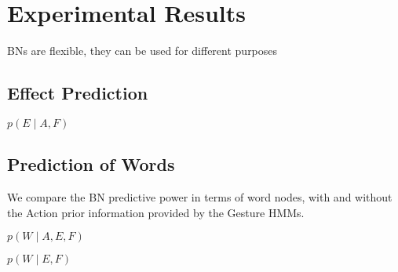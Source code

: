 
\section{Experimental Results}

\acp{BN} are flexible, they can be used for different purposes



\subsection{Effect Prediction}

$p(E \mid A, F)$

\subsection{Prediction of Words}

We compare the \ac{BN} predictive power in terms of word nodes, with and without the Action prior information provided by the Gesture \acp{HMM}.

$p(W \mid A, E, F)$

$p(W \mid E, F)$
